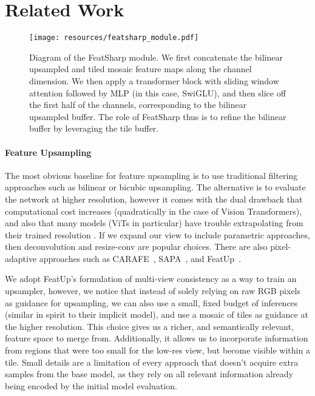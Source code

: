 \section{Related Work}
\label{sec:related}

\begin{figure}[t]
    \centering
    \texttt{[image: resources/featsharp\_module.pdf]}
    \caption{Diagram of the FeatSharp module. We first concatenate the bilinear upsampled and tiled mosaic feature maps along the channel dimension. We then apply a transformer block with sliding window attention followed by MLP (in this case, SwiGLU), and then slice off the first half of the channels, corresponding to the bilinear upsampled buffer. The role of FeatSharp thus is to refine the bilinear buffer by leveraging the tile buffer.}
    \label{fig:featsharp_module_diagram}
\end{figure}

\paragraph{Feature Upsampling}
The most obvious baseline for feature upsampling is to use traditional filtering approaches such as bilinear or bicubic upsampling. The alternative is to evaluate the network at higher resolution, however it comes with the dual drawback that computational cost increases (quadratically in the case of Vision Transformers), and also that many models (ViTs in particular) have trouble extrapolating from their trained resolution \citep{beyer2023flexivit,dehghani2023navit}. If we expand our view to include parametric approaches, then deconvolution \cite{noh2015deconv,shi2016deconv,dumoulin2016AGT} and resize-conv \cite{odena2016deconvcheck} are popular choices. There are also pixel-adaptive approaches such as CARAFE~\cite{Wang2019CARAFECR}, SAPA~\cite{lu2022sapa}, and FeatUp~\cite{fu2024featup}. 

We adopt FeatUp's formulation of multi-view consistency as a way to train an upsampler, however, we notice that instead of solely relying on raw RGB pixels as guidance for upsampling, we can also use a small, fixed budget of inferences (similar in spirit to their implicit model), and use a mosaic of tiles as guidance at the higher resolution. This choice gives us a richer, and semantically relevant, feature space to merge from. Additionally, it allows us to incorporate information from regions that were too small for the low-res view, but become visible within a tile. Small details are a limitation of every approach that doesn't acquire extra samples from the base model, as they rely on all relevant information already being encoded by the initial model evaluation.

